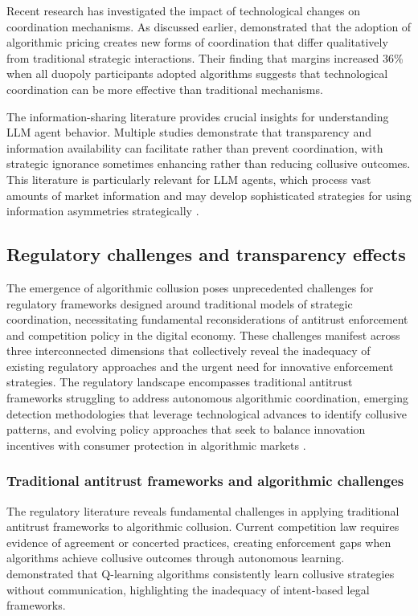 Recent research has investigated the impact of technological changes on coordination mechanisms. As discussed earlier, \textcite{assad_algorithmic_2024} demonstrated that the adoption of algorithmic pricing creates new forms of coordination that differ qualitatively from traditional strategic interactions. Their finding that margins increased 36\% when all duopoly participants adopted algorithms suggests that technological coordination can be more effective than traditional mechanisms.

The information-sharing literature provides crucial insights for understanding LLM agent behavior. Multiple studies demonstrate that transparency and information availability can facilitate rather than prevent coordination, with strategic ignorance sometimes enhancing rather than reducing collusive outcomes. This literature is particularly relevant for LLM agents, which process vast amounts of market information and may develop sophisticated strategies for using information asymmetries strategically \parencite{kuhn_information_1995, gal_algorithmic-facilitated_2017}.

\subsection{Regulatory challenges and transparency effects}

The emergence of algorithmic collusion poses unprecedented challenges for regulatory frameworks designed around traditional models of strategic coordination, necessitating fundamental reconsiderations of antitrust enforcement and competition policy in the digital economy. These challenges manifest across three interconnected dimensions that collectively reveal the inadequacy of existing regulatory approaches and the urgent need for innovative enforcement strategies. The regulatory landscape encompasses traditional antitrust frameworks struggling to address autonomous algorithmic coordination, emerging detection methodologies that leverage technological advances to identify collusive patterns, and evolving policy approaches that seek to balance innovation incentives with consumer protection in algorithmic markets \parencite{ezrachi_sustainable_2020}.

\subsubsection*{Traditional antitrust frameworks and algorithmic challenges}

The regulatory literature reveals fundamental challenges in applying traditional antitrust frameworks to algorithmic collusion. Current competition law requires evidence of agreement or concerted practices, creating enforcement gaps when algorithms achieve collusive outcomes through autonomous learning. \textcite{calvano_artificial_2020} demonstrated that Q-learning algorithms consistently learn collusive strategies without communication, highlighting the inadequacy of intent-based legal frameworks.

